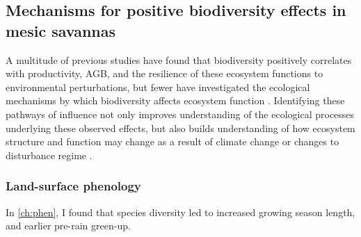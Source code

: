 \begin{refsection}



\subsection{Mechanisms for positive biodiversity effects in mesic savannas}

A multitude of previous studies have found that biodiversity positively correlates with productivity, AGB, and the resilience of these ecosystem functions to environmental perturbations, but fewer have investigated the ecological mechanisms by which biodiversity affects ecosystem function \citep{}. Identifying these pathways of influence not only improves understanding of the ecological processes underlying these observed effects, but also builds understanding of how ecosystem structure and function may change as a result of climate change or changes to disturbance regime \citep{}.

\subsubsection{Land-surface phenology}

In \autoref{ch:phen}, I found that species diversity led to increased growing season length, and earlier pre-rain green-up. 



\end{refsection}
